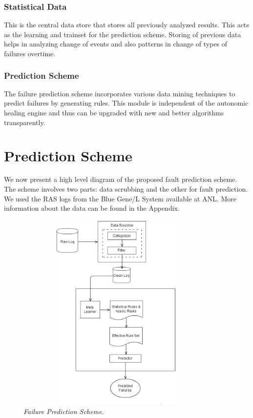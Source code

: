 \subsubsection{Statistical Data}
This is the central data store that stores all previously analyzed results. This acts as the learning and trainset for the prediction scheme. Storing of previous data helps in analyzing change of events and also patterns in change of types of failures overtime.
\subsubsection{Prediction Scheme}
The failure prediction scheme incorporates various data mining techniques to predict failures by generating rules. This module is independent of the autonomic healing engine and thus can be upgraded with new and better algorithms transparently.
\section{Prediction Scheme}
We now present a high level diagram of the proposed fault prediction scheme. The scheme involves two parts: data scrubbing and the other for fault prediction. We used the RAS logs from the Blue Gene/L System available at ANL.\cite{FAILURE_1}\cite{BLUEGENE_1}\cite{BLUEGENE_2}\cite{FAILURE_4} More information about the data can be found in the Appendix.
\begin{figure}[t]
		\begin{center}
			\includegraphics[width=10cm,height=10cm]{figures/failure_prediction_scheme.eps} 
			\caption{\small \sl Failure Prediction Scheme.\label{fig:Label7}} 
		\end{center} 
	\end{figure}


